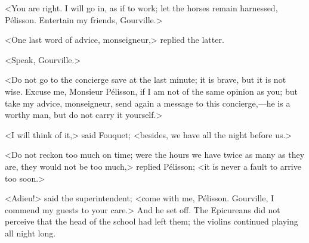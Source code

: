 <You are right. I will go in, as if to work; let the horses remain harnessed, Pélisson. Entertain my friends, Gourville.>

<One last word of advice, monseigneur,> replied the latter.

<Speak, Gourville.>

<Do not go to the concierge save at the last minute; it is brave, but it is not wise. Excuse me, Monsieur Pélisson, if I am not of the same opinion as you; but take my advice, monseigneur, send again a message to this concierge,—he is a worthy man, but do not carry it yourself.>

<I will think of it,> said Fouquet; <besides, we have all the night before us.>

<Do not reckon too much on time; were the hours we have twice as many as they are, they would not be too much,> replied Pélisson; <it is never a fault to arrive too soon.>

<Adieu!> said the superintendent; <come with me, Pélisson. Gourville, I commend my guests to your care.> And he set off. The Epicureans did not perceive that the head of the school had left them; the violins continued playing all night long. 